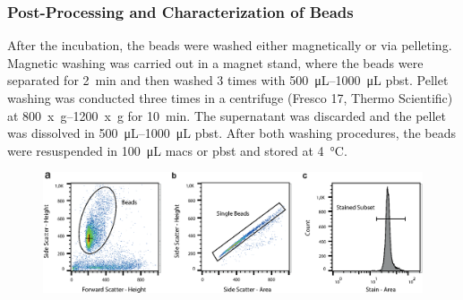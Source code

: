 \subsubsection{Post-Processing and Characterization of Beads}
\label{sec:meth:beadCharact}
After the incubation, the beads were washed either magnetically or via pelleting. Magnetic washing was carried out in a magnet stand, where the beads were separated for \SI{2}{\minute} and then washed 3 times with \SIrange{500}{1000}{\micro\liter} \gls{pbst}. Pellet washing was conducted three times in a centrifuge (Fresco 17, Thermo Scientific) at \SIrange{800}{1200}{x g} for \SI{10}{\minute}. The supernatant was discarded and the pellet was dissolved in \SIrange{500}{1000}{\micro\liter} \gls{pbst}. After both washing procedures, the beads were  resuspended in \SI{100}{\micro\liter} \gls{macs} or \gls{pbst} and stored at \SI{4}{\degreeCelsius}.
\begin{figure}[htb!]
	\centering 
	\includegraphics[width=\linewidth] {Ressources/GatingStrategy/GatingStrategy-Layout_with_margin.eps}
	\label{fig:gatingstrategy-layout}
\end{figure}

